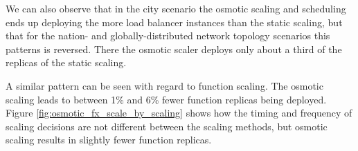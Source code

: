We can also observe that in the city scenario the osmotic scaling and scheduling ends up deploying the more load balancer instances than the static scaling, but that for the nation- and globally-distributed network topology scenarios this patterns is reversed. There the osmotic scaler deploys only about a third of the replicas of the static scaling.

A similar pattern can be seen with regard to function scaling.
The osmotic scaling leads to between 1\% and 6\% fewer function replicas being deployed. Figure \ref{fig:osmotic_fx_scale_by_scaling} shows how the timing and frequency of scaling decisions are not different between the scaling methods, but osmotic scaling results in slightly fewer function replicas. 